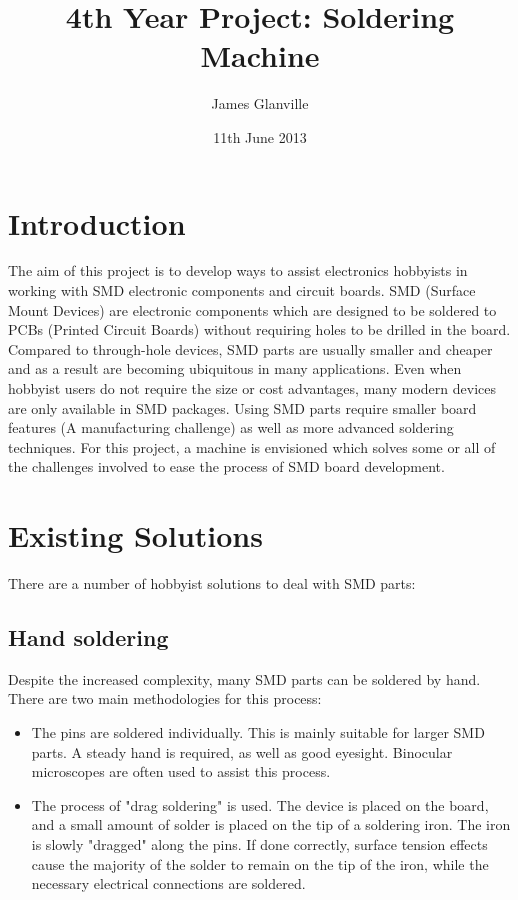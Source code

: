 \documentclass[a4paper,11pt]{article}  %
\title{4th Year Project: Soldering Machine}
\author{James Glanville}
\date{11th June 2013}
\begin{document}
\maketitle


\tableofcontents

\section{Introduction}
The aim of this project is to develop ways to assist electronics hobbyists in working with SMD electronic components
and circuit boards. SMD (Surface Mount Devices) are electronic components which are designed to be soldered to PCBs
(Printed Circuit Boards) without requiring holes to be drilled in the board. Compared to through-hole devices, SMD parts 
are usually smaller and cheaper and as a result are becoming ubiquitous in many applications. Even when hobbyist users do
not require the size or cost advantages, many modern devices are only available in SMD packages. Using SMD parts require
smaller board features (A manufacturing challenge) as well as more advanced soldering techniques. For this project, a machine
is envisioned which solves some or all of the challenges involved to ease the process of SMD board development.

\section{Existing Solutions}
There are a number of hobbyist solutions to deal with SMD parts:

\subsection{Hand soldering}
Despite the increased complexity, many SMD parts can be soldered by hand. There are two main methodologies for this process:

\begin{itemize}
	\item	The pins are soldered individually. This is mainly suitable for larger SMD parts. A steady hand is required, as well as good eyesight.
			Binocular microscopes are often used to assist this process.
			
	\item	The process of "drag soldering" is used. The device is placed on the board, and a small amount of solder is placed on the tip of a soldering iron.
			The iron is slowly "dragged" along the pins. If done correctly, surface tension effects cause the majority of the solder to remain on the tip of the iron,
			while the necessary electrical connections are soldered.
\end{itemize}
\end{document}
